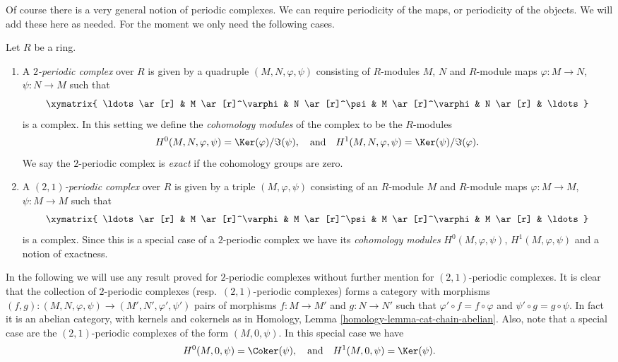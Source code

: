 \noindent
Of course there is a very general notion of periodic complexes.
We can require periodicity of the maps, or periodicity of the objects.
We will add these here as needed. For the moment we only need
the following cases.

\begin{definition}
\label{definition-periodic-complex}
Let $R$ be a ring.
\begin{enumerate}
\item A {\it $2$-periodic complex} over $R$ is given
by a quadruple $(M, N, \varphi, \psi)$ consisting of
$R$-modules $M$, $N$ and $R$-module maps $\varphi : M \to N$,
$\psi : N \to M$ such that
$$
\xymatrix{
\ldots \ar[r] &
M \ar[r]^\varphi &
N \ar[r]^\psi &
M \ar[r]^\varphi &
N \ar[r] & \ldots
}
$$
is a complex. In this setting we define the {\it cohomology modules}
of the complex to be the $R$-modules
$$
H^0(M, N, \varphi, \psi) = \Ker(\varphi)/\Im(\psi)
, \quad\text{and}\quad
H^1(M, N, \varphi, \psi) = \Ker(\psi)/\Im(\varphi).
$$
We say the $2$-periodic complex is {\it exact} if the cohomology
groups are zero.
\item A {\it $(2, 1)$-periodic complex} over $R$ is given
by a triple $(M, \varphi, \psi)$ consisting of an $R$-module $M$ and
$R$-module maps $\varphi : M \to M$, $\psi : M \to M$
such that
$$
\xymatrix{
\ldots \ar[r] &
M \ar[r]^\varphi &
M \ar[r]^\psi &
M \ar[r]^\varphi &
M \ar[r] & \ldots
}
$$
is a complex. Since this is a special case of a $2$-periodic complex
we have its {\it cohomology modules} $H^0(M, \varphi, \psi)$,
$H^1(M, \varphi, \psi)$ and a notion of exactness.
\end{enumerate}
\end{definition}

\noindent
In the following we will use any result proved for $2$-periodic
complexes without further mention for $(2, 1)$-periodic complexes.
It is clear that the collection of $2$-periodic complexes
(resp.\ $(2, 1)$-periodic complexes) forms a category with morphisms
$(f, g) : (M, N, \varphi, \psi) \to (M', N', \varphi', \psi')$
pairs of morphisms $f : M \to M'$ and $g : N \to N'$ such
that $\varphi' \circ f = f \circ \varphi$ and $\psi' \circ g = g \circ \psi$.
In fact it is an abelian category, with kernels and cokernels as in
Homology, Lemma \ref{homology-lemma-cat-chain-abelian}.
Also, note that a special case are the
$(2, 1)$-periodic complexes of the form $(M, 0, \psi)$. In this
special case we have
$$
H^0(M, 0, \psi) = \Coker(\psi)
, \quad\text{and}\quad
H^1(M, 0, \psi) = \Ker(\psi).
$$

